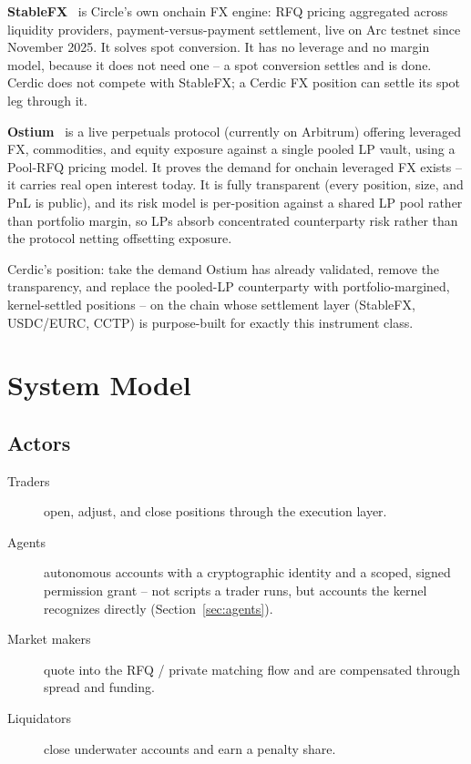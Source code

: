 \documentclass[11pt,a4paper]{article}
\begin{document}
\textbf{StableFX}~\cite{circle_stablefx} is Circle's own onchain FX engine: RFQ pricing aggregated across liquidity providers, payment-versus-payment settlement, live on Arc testnet since November 2025. It solves spot conversion. It has no leverage and no margin model, because it does not need one -- a spot conversion settles and is done. Cerdic does not compete with StableFX; a Cerdic FX position can settle its spot leg through it.

\textbf{Ostium}~\cite{ostium} is a live perpetuals protocol (currently on Arbitrum) offering leveraged FX, commodities, and equity exposure against a single pooled LP vault, using a Pool-RFQ pricing model. It proves the demand for onchain leveraged FX exists -- it carries real open interest today. It is fully transparent (every position, size, and PnL is public), and its risk model is per-position against a shared LP pool rather than portfolio margin, so LPs absorb concentrated counterparty risk rather than the protocol netting offsetting exposure.

Cerdic's position: take the demand Ostium has already validated, remove the transparency, and replace the pooled-LP counterparty with portfolio-margined, kernel-settled positions -- on the chain whose settlement layer (StableFX, USDC/EURC, CCTP) is purpose-built for exactly this instrument class.

\section{System Model}
\label{sec:model}

\subsection{Actors}

\begin{description}
  \item[Traders] open, adjust, and close positions through the execution layer.
  \item[Agents] autonomous accounts with a cryptographic identity and a scoped, signed permission grant -- not scripts a trader runs, but accounts the kernel recognizes directly (Section~\ref{sec:agents}).
  \item[Market makers] quote into the RFQ / private matching flow and are compensated through spread and funding.
  \item[Liquidators] close underwater accounts and earn a penalty share.
\end{description}
\end{document}
